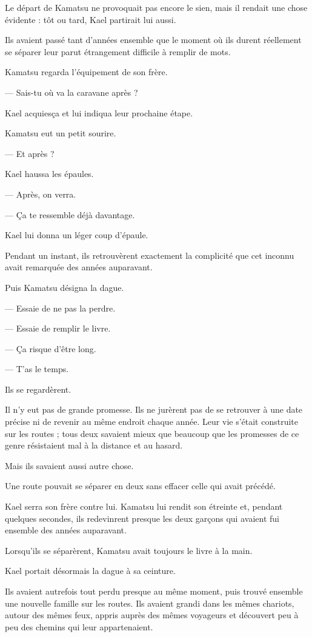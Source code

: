 Le départ de Kamatsu ne provoquait pas encore le sien, mais il rendait une
chose évidente : tôt ou tard, Kael partirait lui aussi.

Ils avaient passé tant d'années ensemble que le moment où ils durent réellement
se séparer leur parut étrangement difficile à remplir de mots.

Kamatsu regarda l'équipement de son frère.

— Sais-tu où va la caravane après ?

Kael acquiesça et lui indiqua leur prochaine étape.

Kamatsu eut un petit sourire.

— Et après ?

Kael haussa les épaules.

— Après, on verra.

— Ça te ressemble déjà davantage.

Kael lui donna un léger coup d'épaule.

Pendant un instant, ils retrouvèrent exactement la complicité que cet inconnu
avait remarquée des années auparavant.

Puis Kamatsu désigna la dague.

— Essaie de ne pas la perdre.

— Essaie de remplir le livre.

— Ça risque d'être long.

— T'as le temps.

Ils se regardèrent.

Il n'y eut pas de grande promesse. Ils ne jurèrent pas de se retrouver à une
date précise ni de revenir au même endroit chaque année. Leur vie s'était
construite sur les routes ; tous deux savaient mieux que beaucoup que les
promesses de ce genre résistaient mal à la distance et au hasard.

Mais ils savaient aussi autre chose.

Une route pouvait se séparer en deux sans effacer celle qui avait précédé.

Kael serra son frère contre lui. Kamatsu lui rendit son étreinte et, pendant
quelques secondes, ils redevinrent presque les deux garçons qui avaient fui
ensemble des années auparavant.

Lorsqu'ils se séparèrent, Kamatsu avait toujours le livre à la main.

Kael portait désormais la dague à sa ceinture.

Ils avaient autrefois tout perdu presque au même moment, puis trouvé ensemble
une nouvelle famille sur les routes. Ils avaient grandi dans les mêmes
chariots, autour des mêmes feux, appris auprès des mêmes voyageurs et découvert
peu à peu des chemins qui leur appartenaient.


